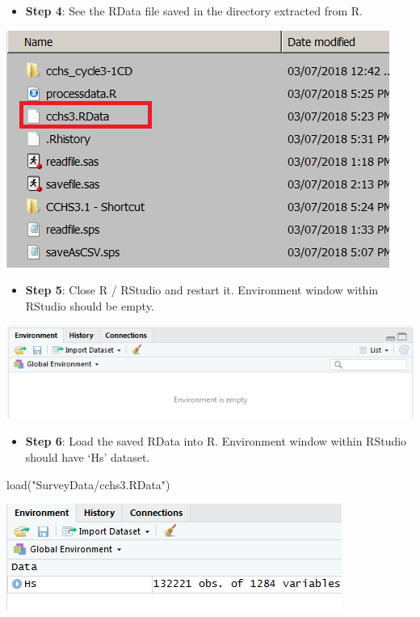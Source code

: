 \documentclass[
]{book}
\newenvironment{Shaded}{\begin{snugshade}}{\end{snugshade}}
\newcommand{\FunctionTok}[1]{\textcolor[rgb]{0.00,0.00,0.00}{#1}}
\newcommand{\NormalTok}[1]{#1}
\newcommand{\StringTok}[1]{\textcolor[rgb]{0.31,0.60,0.02}{#1}}
\providecommand{\tightlist}{%
  \setlength{\itemsep}{0pt}\setlength{\parskip}{0pt}}
\begin{document}
\begin{itemize}
\tightlist
\item
  \textbf{Step 4}: See the RData file saved in the directory extracted from R.
\end{itemize}

\includegraphics[width=0.65\linewidth]{images/abacus43}

\begin{itemize}
\tightlist
\item
  \textbf{Step 5}: Close R / RStudio and restart it. Environment window within RStudio should be empty.
\end{itemize}

\includegraphics[width=0.65\linewidth]{images/abacus44}

\begin{itemize}
\tightlist
\item
  \textbf{Step 6}: Load the saved RData into R. Environment window within RStudio should have `Hs' dataset.
\end{itemize}

\begin{Shaded}
\begin{Highlighting}[]
\FunctionTok{load}\NormalTok{(}\StringTok{"SurveyData/cchs3.RData"}\NormalTok{)}
\end{Highlighting}
\end{Shaded}

\includegraphics[width=0.65\linewidth]{images/abacus45}
\end{document}

